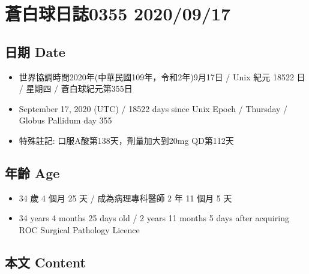 \documentclass[a5paper, 11pt
]{book}
\providecommand{\tightlist}{%
  \setlength{\itemsep}{0pt}\setlength{\parskip}{0pt}}
\begin{document}
\hypertarget{ux84bcux767dux7403ux65e5ux8a8c0355-20200917}{%
\section{蒼白球日誌0355
2020/09/17}\label{ux84bcux767dux7403ux65e5ux8a8c0355-20200917}}

\hypertarget{ux65e5ux671f-date-16}{%
\subsection{日期 Date}\label{ux65e5ux671f-date-16}}

\begin{itemize}
\tightlist
\item
  世界協調時間2020年(中華民國109年，令和2年)9月17日 / Unix 紀元 18522 日
  / 星期四 / 蒼白球紀元第355日
\item
  September 17, 2020 (UTC) / 18522 days since Unix Epoch / Thursday /
  Globus Pallidum day 355
\item
  特殊註記: 口服A酸第138天，劑量加大到20mg QD第112天
\end{itemize}

\hypertarget{ux5e74ux9f61-age-16}{%
\subsection{年齡 Age}\label{ux5e74ux9f61-age-16}}

\begin{itemize}
\tightlist
\item
  34 歲 4 個月 25 天 / 成為病理專科醫師 2 年 11 個月 5 天
\item
  34 years 4 months 25 days old / 2 years 11 months 5 days after
  acquiring ROC Surgical Pathology Licence
\end{itemize}

\hypertarget{ux672cux6587-content-16}{%
\subsection{本文 Content}\label{ux672cux6587-content-16}}
\end{document}
